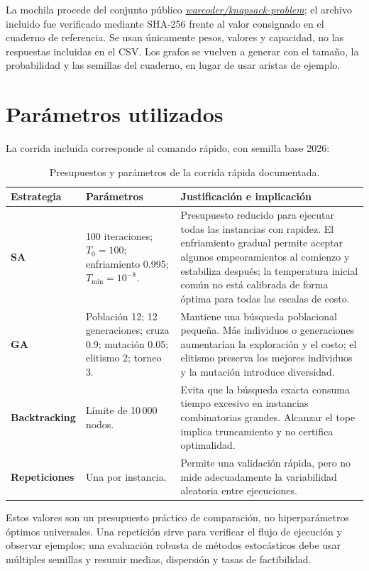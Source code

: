 \documentclass[12pt,letterpaper]{article}
\begin{document}
La mochila procede del conjunto público
\href{https://www.kaggle.com/datasets/warcoder/knapsack-problem}
{\emph{warcoder/knapsack-problem}}; el archivo incluido fue verificado mediante
SHA-256 frente al valor consignado en el cuaderno de referencia. Se usan
únicamente pesos, valores y capacidad, no las respuestas incluidas en el CSV.
Los grafos se vuelven a generar con el tamaño, la probabilidad y las semillas
del cuaderno, en lugar de usar aristas de ejemplo.

\section{Parámetros utilizados}

La corrida incluida corresponde al comando rápido, con semilla base 2026:

\begin{table}[H]
  \centering
  \caption{Presupuestos y parámetros de la corrida rápida documentada.}
  \begin{tabularx}{\textwidth}{>{\bfseries}p{3.1cm} p{3.4cm} X}
    \toprule
    Estrategia & Parámetros & Justificación e implicación \\
    \midrule
    SA & 100 iteraciones; $T_0=100$; enfriamiento 0.995; $T_{\min}=10^{-8}$. &
    Presupuesto reducido para ejecutar todas las instancias con rapidez. El enfriamiento gradual permite aceptar algunos empeoramientos al comienzo y estabiliza después; la temperatura inicial común no está calibrada de forma óptima para todas las escalas de costo. \\
    GA & Población 12; 12 generaciones; cruza 0.9; mutación 0.05; elitismo 2; torneo 3. &
    Mantiene una búsqueda poblacional pequeña. Más individuos o generaciones aumentarían la exploración y el costo; el elitismo preserva los mejores individuos y la mutación introduce diversidad. \\
    Backtracking & Límite de 10\,000 nodos. &
    Evita que la búsqueda exacta consuma tiempo excesivo en instancias combinatorias grandes. Alcanzar el tope implica truncamiento y no certifica optimalidad. \\
    Repeticiones & Una por instancia. &
    Permite una validación rápida, pero no mide adecuadamente la variabilidad aleatoria entre ejecuciones. \\
    \bottomrule
  \end{tabularx}
\end{table}

Estos valores son un presupuesto práctico de comparación, no hiperparámetros
óptimos universales. Una repetición sirve para verificar el flujo de ejecución
y observar ejemplos; una evaluación robusta de métodos estocásticos debe usar
múltiples semillas y resumir medias, dispersión y tasas de factibilidad.
\end{document}
